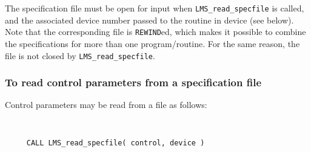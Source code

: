 \documentclass{galahad}
\newcommand{\packagename}{LMS}
\begin{document}
The specification file must be open for
input when {\tt \packagename\_read\_specfile}
is called, and the associated device number
passed to the routine in device (see below).
Note that the corresponding
file is {\tt REWIND}ed, which makes it possible to combine the specifications
for more than one program/routine.  For the same reason, the file is not
closed by {\tt \packagename\_read\_specfile}.

\subsubsection{To read control parameters from a specification file}
\label{readspec}

Control parameters may be read from a file as follows:
\hskip0.5in

\def\baselinestretch{0.8}
{\tt
\begin{verbatim}
     CALL LMS_read_specfile( control, device )
\end{verbatim}
}
\def\baselinestretch{1.0}
\end{document}
